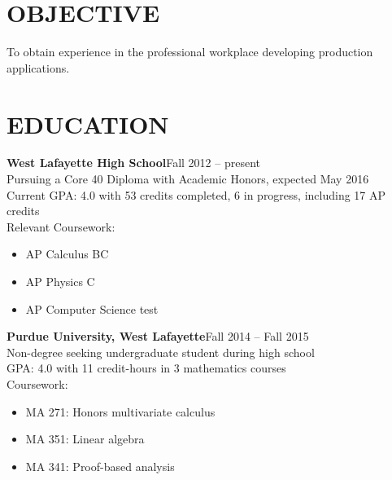 \documentclass[line,margin]{res}
\begin{document}
\begin{resume}

  \section{OBJECTIVE}
  To obtain experience in the professional workplace developing production applications.


  \section{EDUCATION}
  {\bf\rmfamily West Lafayette High School}\hfill Fall 2012 -- present\\
  Pursuing a Core 40 Diploma with Academic Honors, expected May 2016\\
  Current GPA: 4.0 with 53 credits completed, 6 in progress, including 17 AP credits\\
  Relevant Coursework:
  \multicolsep 0pt
  \begin{multicols}{2}
  \begin{itemize} \itemsep -2pt\RaggedRight
  \item AP Calculus BC
  \item AP Physics C
    \columnbreak
  \item AP Computer Science test
  \end{itemize}
  \end{multicols}

  {\bf\rmfamily Purdue University, West Lafayette}\hfill Fall 2014 -- Fall 2015\\
  Non-degree seeking undergraduate student during high school\\
  GPA: 4.0 with 11 credit-hours in 3 mathematics courses \\
  Coursework:
  \multicolsep 0pt
  \begin{multicols}{2}
  \begin{itemize} \itemsep -2pt
  \item MA 271: Honors multivariate calculus
  \item MA 351: Linear algebra
  \item MA 341: Proof-based analysis
  \end{itemize}
  \end{multicols}




\end{resume}
\end{document}
